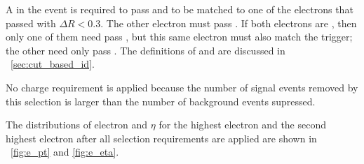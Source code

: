 A \CentralElectron in the event is required to pass \EGTIGHT and to be matched
to one of the electrons that passed \SingleElectronTrigger with $\Delta R <
0.3$. The other electron must pass \EGMEDIUM. If both electrons are
\CentralElectrons, then only one of them need pass \EGTIGHT, but this same
electron must also match the trigger; the other \CentralElectron need only pass
\EGMEDIUM. The definitions of \EGMEDIUM and \EGTIGHT are discussed in
\SEC~\ref{sec:cut_based_id}.

No charge requirement is applied because the number of signal events removed by
this selection is larger than the number of background events supressed.

The distributions of electron \pt and $\eta$ for the highest \pt electron and
the second highest \pt electron after all selection requirements are applied
are shown in \FIGS~\ref{fig:e_pt} and \ref{fig:e_eta}.

